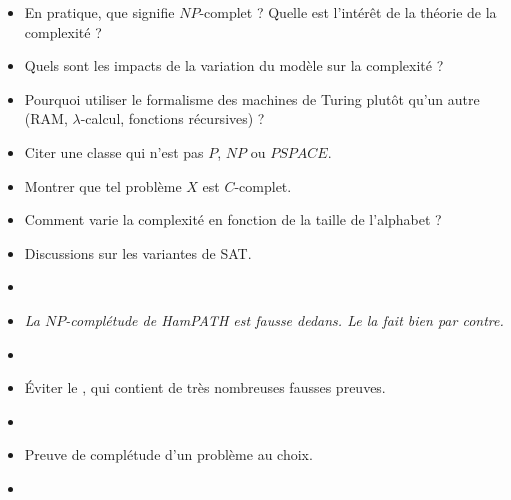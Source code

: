 \documentclass{agregfiche}
\begin{document}
\begin{itemize}
    \item En pratique, que signifie $NP$-complet ? Quelle est
      l'intérêt de la théorie de la complexité ?
    \item Quels sont les impacts de la variation du modèle sur la
    complexité ?
    \item Pourquoi utiliser le formalisme des machines de Turing
        plutôt qu'un autre (RAM, $\lambda$-calcul, fonctions
        récursives) ?
    \item Citer une classe qui n'est pas $P$, $NP$ ou $PSPACE$.
    \item Montrer que tel problème $X$ est $C$-complet.
    \item Comment varie la complexité en fonction de la taille de
    l'alphabet ?
    \item Discussions sur les variantes de SAT.
\end{itemize}

\secreferences

\begin{itemize}
    \item 
    \item 
      \textit{La $NP$-complétude de HamPATH est fausse dedans. Le  la fait bien par contre.}
    \item 
    \item Éviter le , qui contient de très nombreuses
fausses preuves.
\end{itemize}

\secdev

\begin{itemize}
    \item 
    \item Preuve de complétude d'un problème au choix.
    \item 
\end{itemize}
\end{document}
